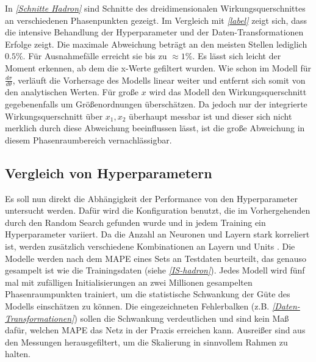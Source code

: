 In \textit{\autoref{Schnitte Hadron}} sind Schnitte des dreidimensionalen Wirkungsquerschnittes an verschiedenen Phasenpunkten gezeigt. Im Vergleich mit \textit{\autoref{label}} zeigt sich, dass die intensive Behandlung der Hyperparameter und der Daten-Transformationen Erfolge zeigt. Die maximale Abweichung beträgt an den meisten Stellen lediglich $0.5\%$. Für Ausnahmefälle erreicht sie bis zu $\approx 1\%$. Es lässt sich leicht der Moment erkennen, ab dem die x-Werte gefiltert wurden. Wie schon im Modell für $\frac{d\sigma}{d\theta}$, verläuft die Vorhersage des Modells linear weiter und entfernt sich somit von den analytischen Werten. Für große $x$ wird das Modell den Wirkungsquerschnitt gegebenenfalls um Größenordnungen überschätzen. Da jedoch nur der integrierte Wirkungsquerschnitt über $x_1, x_2$ überhaupt messbar ist und dieser sich nicht merklich durch diese Abweichung beeinflussen lässt, ist die große Abweichung in diesem Phasenraumbereich vernachlässigbar. 
\subsection{Vergleich von Hyperparametern}
Es soll nun direkt die Abhängigkeit der Performance von den Hyperparameter untersucht werden. Dafür wird die Konfiguration benutzt, die im Vorhergehenden durch den Random Search gefunden wurde und in jedem Training ein Hyperparameter variiert. Da die Anzahl an Neuronen und Layern stark korreliert ist, werden zusätzlich verschiedene Kombinationen an Layern und Units . Die Modelle werden nach dem MAPE eines Sets an Testdaten beurteilt, das genauso gesampelt ist wie die Trainingsdaten (siehe \textit{\autoref{IS-hadron}}). Jedes Modell wird fünf mal mit zufälligen Initialisierungen an zwei Millionen gesampelten Phasenraumpunkten trainiert, um die statistische Schwankung der Güte des Modells einschätzen zu können. Die eingezeichneten Fehlerbalken (z.B. \textit{\autoref{Daten-Transformationen}}) sollen die Schwankung verdeutlichen und sind kein Maß dafür, welchen MAPE das Netz in der Praxis erreichen kann. Ausreißer sind aus den Messungen herausgefiltert, um die Skalierung in sinnvollem Rahmen zu halten. 

